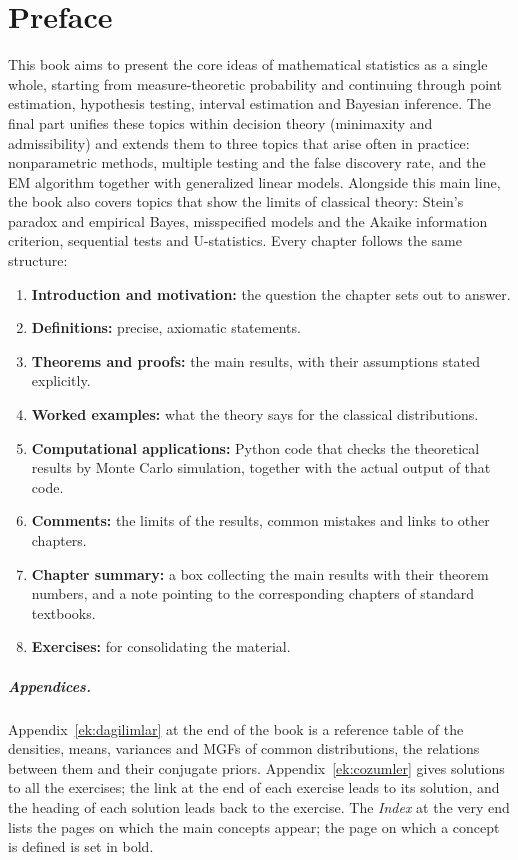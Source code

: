 \documentclass[main.tex]{subfiles}
\begin{document}
\chapter{Preface}

This book aims to present the core ideas of mathematical statistics as a single whole, starting from measure-theoretic probability and continuing through point estimation, hypothesis testing, interval estimation and Bayesian inference. The final part unifies these topics within decision theory (minimaxity and admissibility) and extends them to three topics that arise often in practice: nonparametric methods, multiple testing and the false discovery rate, and the EM algorithm together with generalized linear models. Alongside this main line, the book also covers topics that show the limits of classical theory: Stein's paradox and empirical Bayes, misspecified models and the Akaike information criterion, sequential tests and U-statistics. Every chapter follows the same structure:

\begin{enumerate}[label=\textbf{\arabic*.}]
  \item \textbf{Introduction and motivation:} the question the chapter sets out to answer.
  \item \textbf{Definitions:} precise, axiomatic statements.
  \item \textbf{Theorems and proofs:} the main results, with their assumptions stated explicitly.
  \item \textbf{Worked examples:} what the theory says for the classical distributions.
  \item \textbf{Computational applications:} Python code that checks the theoretical results by Monte Carlo simulation, together with the actual output of that code.
  \item \textbf{Comments:} the limits of the results, common mistakes and links to other chapters.
  \item \textbf{Chapter summary:} a box collecting the main results with their theorem numbers, and a note pointing to the corresponding chapters of standard textbooks.
  \item \textbf{Exercises:} for consolidating the material.
\end{enumerate}

\paragraph{Appendices.} Appendix~\ref{ek:dagilimlar} at the end of the book is a reference table of the densities, means, variances and MGFs of common distributions, the relations between them and their conjugate priors. Appendix~\ref{ek:cozumler} gives solutions to all the exercises; the link at the end of each exercise leads to its solution, and the heading of each solution leads back to the exercise. The \emph{Index} at the very end lists the pages on which the main concepts appear; the page on which a concept is defined is set in bold.
\end{document}
